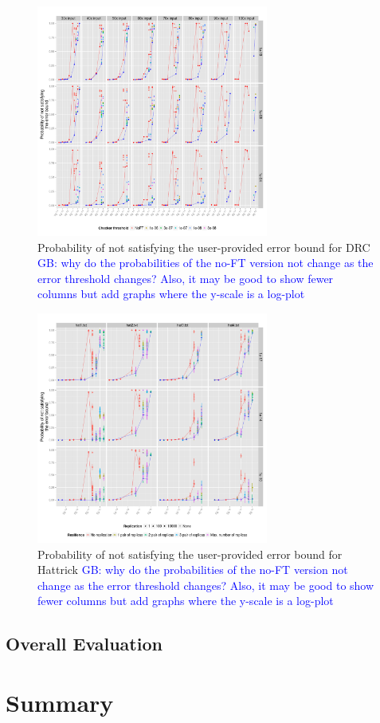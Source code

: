 \documentclass{sig-alternate}
\newcommand{\greg}[1]{%
  \textcolor{blue}{GB: #1}
}
\begin{document}
\begin{figure}[ht!]
\centering
\includegraphics[height=3in]{figs/DRC_ImperfectRate.png}
\caption{Probability of not satisfying the user-provided error bound for DRC \greg{why do the probabilities of the no-FT version not change as the error threshold changes? Also, it may be good to show fewer columns but add graphs where the y-scale is a log-plot}}
\label{fig:DRC_ImperfectRate}
\end{figure}

\begin{figure}[ht!]
\centering
\includegraphics[height=3in]{figs/Hattrick_ImperfectRate.png}
\caption{Probability of not satisfying the user-provided error bound for Hattrick \greg{why do the probabilities of the no-FT version not change as the error threshold changes? Also, it may be good to show fewer columns but add graphs where the y-scale is a log-plot}}
\label{fig:Hattrick_ImperfectRate}
\end{figure}

\subsection{Overall Evaluation}
\label{sec:eval:overall}


\section{Summary}
\label{sec:summary}



\end{document}
